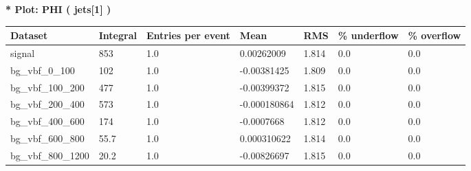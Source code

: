 \documentclass[a4paper, 10pt]{article}
\begin{document}
\textbf{* Plot: PHI ( jets[1] ) }\\
   \begin{table}[H]
  \begin{center}
    \begin{tabular}{|m{23.0mm}|m{23.0mm}|m{18.0mm}|m{19.0mm}|m{19.0mm}|m{19.0mm}|m{19.0mm}|}
      \hline
      {\cellcolor{yellow}         Dataset}& {\cellcolor{yellow}         Integral}& {\cellcolor{yellow}         Entries per event}& {\cellcolor{yellow}         Mean}& {\cellcolor{yellow}         RMS}& {\cellcolor{yellow}         \% underflow}& {\cellcolor{yellow}         \% overflow}\\
      \hline
      {\cellcolor{white}         signal}& {\cellcolor{white}         853}& {\cellcolor{white}         1.0}& {\cellcolor{white}         0.00262009}& {\cellcolor{white}         1.814}& {\cellcolor{green}         0.0}& {\cellcolor{green}         0.0}\\
      \hline
      {\cellcolor{white}         bg\_vbf\_0\_100}& {\cellcolor{white}         102}& {\cellcolor{white}         1.0}& {\cellcolor{white}         -0.00381425}& {\cellcolor{white}         1.809}& {\cellcolor{green}         0.0}& {\cellcolor{green}         0.0}\\
      \hline
      {\cellcolor{white}         bg\_vbf\_100\_200}& {\cellcolor{white}         477}& {\cellcolor{white}         1.0}& {\cellcolor{white}         -0.00399372}& {\cellcolor{white}         1.815}& {\cellcolor{green}         0.0}& {\cellcolor{green}         0.0}\\
      \hline
      {\cellcolor{white}         bg\_vbf\_200\_400}& {\cellcolor{white}         573}& {\cellcolor{white}         1.0}& {\cellcolor{white}         -0.000180864}& {\cellcolor{white}         1.812}& {\cellcolor{green}         0.0}& {\cellcolor{green}         0.0}\\
      \hline
      {\cellcolor{white}         bg\_vbf\_400\_600}& {\cellcolor{white}         174}& {\cellcolor{white}         1.0}& {\cellcolor{white}         -0.0007668}& {\cellcolor{white}         1.812}& {\cellcolor{green}         0.0}& {\cellcolor{green}         0.0}\\
      \hline
      {\cellcolor{white}         bg\_vbf\_600\_800}& {\cellcolor{white}         55.7}& {\cellcolor{white}         1.0}& {\cellcolor{white}         0.000310622}& {\cellcolor{white}         1.814}& {\cellcolor{green}         0.0}& {\cellcolor{green}         0.0}\\
      \hline
      {\cellcolor{white}         bg\_vbf\_800\_1200}& {\cellcolor{white}         20.2}& {\cellcolor{white}         1.0}& {\cellcolor{white}         -0.00826697}& {\cellcolor{white}         1.815}& {\cellcolor{green}         0.0}& {\cellcolor{green}         0.0}\\

\end{tabular}
\end{center}
\end{table}
\end{document}
